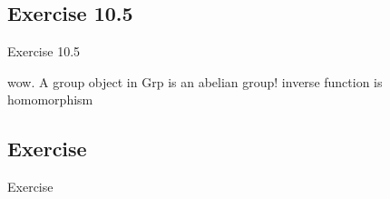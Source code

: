 \documentclass[15pt]{scrartcl}
\begin{document}
\subsection{Exercise 10.5}
\begin{discussion*}Exercise 10.5
    \begin{abboy*}
        wow. A group object in Grp is an abelian group! inverse function is homomorphism 
    \end{abboy*}

\end{discussion*}


\subsection{Exercise }
\begin{discussion*}Exercise 
    \begin{abboy*}
    
    \end{abboy*}
    \begin{arthur*}
    
    \end{arthur*}
    \begin{evie*}
    
    \end{evie*}
\end{discussion*}
\end{document}

